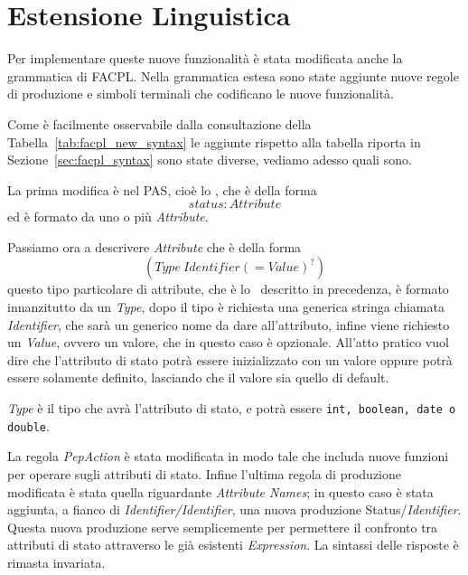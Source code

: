 \section{Estensione Linguistica} %
\label{sec:estensione_linguistica}
Per implementare queste nuove funzionalità è stata modificata anche la grammatica di \ac{FACPL}.
Nella grammatica estesa sono state aggiunte nuove regole di produzione e simboli terminali che 
codificano le nuove funzionalità. \par

Come è facilmente osservabile dalla consultazione della Tabella~\ref{tab:facpl_new_syntax} le aggiunte rispetto alla tabella riporta in Sezione~\ref{sec:facpl_syntax} sono state diverse, vediamo adesso quali sono. \par
La prima modifica è nel \ac{PAS}, cioè  lo \status, che è della forma $$status: Attribute$$ ed è formato da uno o più \textit{Attribute}. \par
Passiamo ora a descrivere \textit{Attribute} che è della forma $$(Type\ Identifier (= Value)^?)$$
questo tipo particolare di attribute, che è lo \statusattribute \ descritto in precedenza, è formato innanzitutto da un \textit{Type}, dopo il tipo è richiesta una generica stringa chiamata \textit{Identifier}, che sarà un generico nome da dare all'attributo, infine viene richiesto un \textit{Value}, ovvero un valore, che in questo caso è opzionale. All'atto pratico vuol dire che l'attributo di stato potrà essere inizializzato con un valore oppure potrà essere solamente definito, lasciando che il valore sia quello di default.

\textit{Type} è il tipo che avrà l'attributo di stato, e potrà essere \texttt{int, boolean, date o double}. \par
La regola \textit{PepAction} è stata modificata in modo tale che includa nuove funzioni per operare sugli attributi di stato.
Infine l'ultima regola di produzione modificata è stata quella riguardante \textit{Attribute Names}; in questo caso è stata aggiunta, a fianco di \textit{Identifier/Identifier}, una nuova produzione Status/\textit{Identifier}. Questa nuova produzione serve semplicemente per permettere il confronto tra attributi di stato attraverso le già esistenti \textit{Expression}.
La sintassi delle risposte è rimasta invariata.


